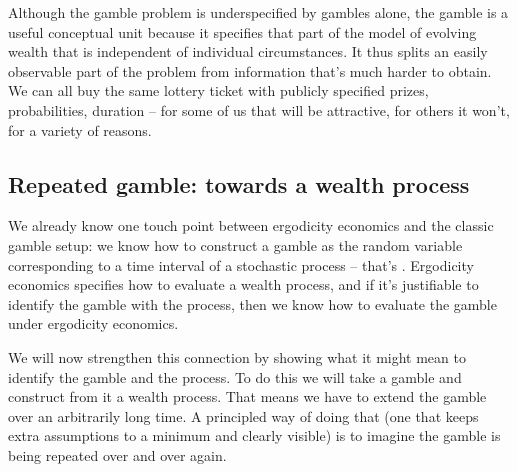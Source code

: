 Although the gamble problem is underspecified by gambles alone, the gamble is a 
useful conceptual unit because it specifies that part of the model of evolving wealth 
that is independent of individual circumstances. It thus splits an easily observable part
of the problem from information that's much harder to obtain. We can all buy the same 
lottery ticket with publicly specified prizes, probabilities, duration -- for some of us that 
will be attractive, for others it won't, for a variety of reasons.

\subsection{Repeated gamble: towards a wealth process}

We already know one touch point between ergodicity economics and 
the classic gamble setup: we know how to construct a gamble as the random variable 
corresponding to a time interval of a stochastic process -- that's .
Ergodicity economics specifies how to evaluate a wealth process, and if
it's justifiable to identify the gamble with the process, then we know how to evaluate 
the gamble under ergodicity economics. 

We will now strengthen this connection by showing what it might mean to identify the gamble 
and the process. To do this we will take a gamble and construct from it a 
wealth process. That means we have to extend the gamble over an arbitrarily long time. 
A principled way of doing that (one that keeps extra assumptions to a minimum and clearly visible)
is to imagine the gamble is being repeated over and over again. 

